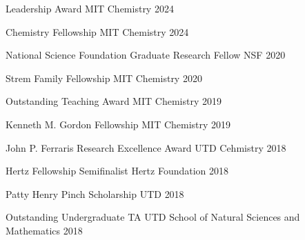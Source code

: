 
\begin{cvhonors}
\cvhonor
  {Leadership Award} %
  {MIT Chemistry} %
  {} %
  {2024} %

\cvhonor
  {Chemistry Fellowship} %
  {MIT Chemistry} %
  {} %
  {2024} %


  \cvhonor
    {National Science Foundation Graduate Research Fellow} %
    {NSF} %
    {} %
    {2020} %
    
    
  \cvhonor
    {Strem Family Fellowship} %
    {MIT Chemistry} %
    {} %
    {2020} %

  \cvhonor
    {Outstanding Teaching Award} %
    {MIT Chemistry} %
    {} %
    {2019} %

  \cvhonor
    {Kenneth M. Gordon Fellowship} %
    {MIT Chemistry} %
    {} %
    {2019} %

  \cvhonor
    {John P. Ferraris Research Excellence Award} %
    {UTD Cehmistry} %
    {} %
    {2018} %


\cvhonor
{Hertz Fellowship Semifinalist} %
{Hertz Foundation} %
{} %
{2018} %


\cvhonor
{Patty Henry Pinch Scholarship} %
{UTD} %
{} %
{2018} %


\cvhonor
{Outstanding Undergraduate TA} %
{UTD School of Natural Sciences and Mathematics} %
{} %
{2018} %


\end{cvhonors}
